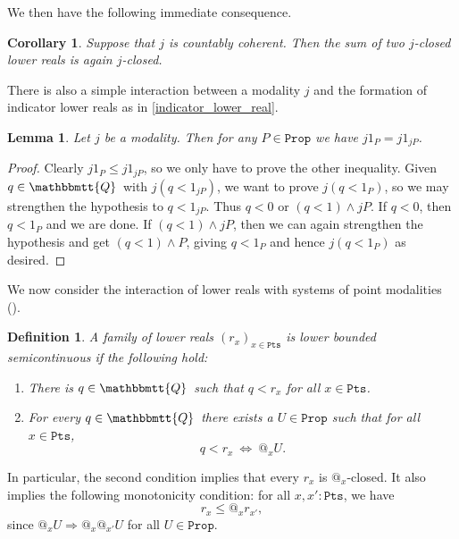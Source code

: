 \documentclass[reqno,11pt]{amsproc}
\makeatletter
\theoremstyle{plain}
\newtheorem{corollary}[theorem]{Corollary}
\newtheorem{lemma}[theorem]{Lemma}
\newtheorem{definition}[theorem]{Definition}
\theoremstyle{definition}
\newcommand{\Const}[1]{\mathtt{#1}}
\newcommand{\ind}[1]{1_{#1}}			%
\newcommand{\internal}[1]{\raisebox{-.03ex}{$\mathbbmtt{#1}$}}
\newcommand{\hs}{\hspace{1pt}}
\newcommand{\tqq}{\internal{Q}\hs}
\newcommand{\prop}{\Const{Prop}}
\newcommand{\pt}{x}
\newcommand{\pts}{\mathtt{Pts}}		%
\newcommand{\atsymbol}{{@}}
\newcommand{\at}[1][\pt]{\atsymbol_{#1}}
\newcommand{\imp}{\Rightarrow}
\newcommand{\beq}{\begin{equation}}
\newcommand{\eeq}{\end{equation}}
\numberwithin{equation}{section}
\makeatother
\begin{document}
We then have the following immediate consequence.

\begin{corollary}
	\label{closed_sum}
	Suppose that $j$ is countably coherent. Then the sum of two $j$-closed lower reals is again $j$-closed.
\end{corollary}

There is also a simple interaction between a modality $j$ and the formation of indicator lower reals as in \eqref{indicator_lower_real}.

\begin{lemma}
	\label{lemma.j_indicator}
	Let $j$ be a modality. Then for any $P \in \prop$ we have $j\ind{P}=j\ind{jP}$.
\end{lemma}

\begin{proof}
	Clearly $j\ind{P}\le j\ind{jP}$, so we only have to prove the other inequality. Given $q \in \tqq$ with $j(q < \ind{jP})$, we want to prove $j(q<\ind{P})$, so we may strengthen the hypothesis to $q < \ind{jP}$. Thus $q < 0$ or $(q < 1) \land jP$. If $q < 0$, then $q < \ind{P}$ and we are done. If $(q < 1) \land jP$, then we can again strengthen the hypothesis and get $(q<1)\land P$, giving $q<\ind{P}$ and hence $j(q<\ind{P})$ as desired.
\end{proof}

We now consider the interaction of lower reals with systems of point modalities ().

\begin{definition}
	A family of lower reals $(r_\pt)_{\pt \in \pts}$ is \emph{lower bounded semicontinuous} if the following hold:
	\begin{enumerate}
		\item There is $q \in \tqq$ such that $q < r_\pt$ for all $\pt \in \pts$.
		\item For every $q \in \tqq$ there exists a $U \in \prop$ such that for all $\pt \in \pts$,
			\beq
				\label{lsc_lr}
				q < r_\pt \: \Longleftrightarrow \: \at U.
			\eeq
	\end{enumerate}
\end{definition}

In particular, the second condition implies that every $r_x$ is $\at$-closed. It also implies the following monotonicity condition: for all $\pt,\pt' : \pts$, we have
\begin{equation}
	\label{r_pt_monotone}
	r_\pt \le \at r_{\pt'},
\end{equation}
since $\at U \imp \at \at[\pt'] U$ for all $U \in \prop$.
\end{document}
